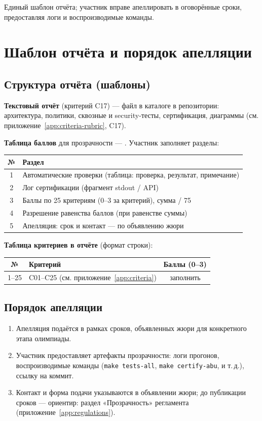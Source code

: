 Единый шаблон отчёта; участник вправе апеллировать в оговорённые сроки, предоставляя логи и воспроизводимые команды.

\chapter{Шаблон отчёта и порядок апелляции}
\label{app:template-appeal}

\section*{Структура отчёта (шаблоны)}

\textbf{Текстовый отчёт} (критерий C17) --- файл в каталоге  в репозитории: архитектура, политики, сквозные и security-тесты, сертификация, диаграммы (см. приложение~\ref{app:criteria-rubric}, C17).

\textbf{Таблица баллов} для прозрачности --- . Участник заполняет разделы:

\begin{tabularx}{\textwidth}{@{}c X@{}}
\toprule
\textbf{№} & \textbf{Раздел} \\
\midrule
1 & Автоматические проверки (таблица: проверка, результат, примечание) \\
2 & Лог сертификации (фрагмент stdout / API) \\
3 & Баллы по 25 критериям (0--3 за критерий), сумма / 75 \\
4 & Разрешение равенства баллов (при равенстве суммы) \\
5 & Апелляция: срок и контакт --- по объявлению жюри \\
\bottomrule
\end{tabularx}

\vspace{0.8em}
\noindent\textbf{Таблица критериев в отчёте} (формат строки):

\begin{tabularx}{\textwidth}{@{}c X c@{}}
\toprule
№ & Критерий & Баллы (0--3) \\
\midrule
1--25 & C01--C25 (см. приложение~\ref{app:criteria}) & заполнить \\
\bottomrule
\end{tabularx}

\section*{Порядок апелляции}

\begin{enumerate}
  \item Апелляция подаётся в рамках сроков, объявленных жюри для конкретного этапа олимпиады.
  \item Участник предоставляет артефакты прозрачности: логи прогонов, воспроизводимые команды (\texttt{make tests-all}, \texttt{make certify-abu}, и т.\,д.), ссылку на коммит.
  \item Контакт и форма подачи указываются в объявлении жюри; до публикации сроков --- ориентир: раздел «Прозрачность» регламента (приложение~\ref{app:regulations}).
\end{enumerate}
